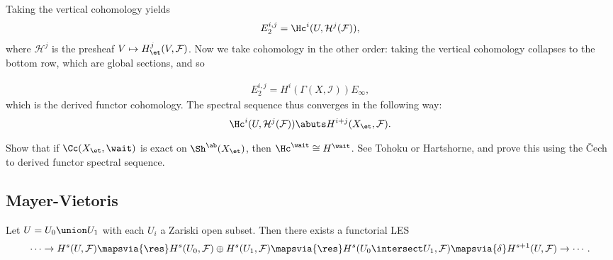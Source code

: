Taking the vertical cohomology yields
\begin{align*}  
E_2^{i, j} = \Hc^i(U, \mathcal{H}^j(\mathcal{F}))
,\end{align*} where \(\mathcal{H}^j\) is the presheaf
\(V\mapsto H_\et^j(V, \mathcal{F})\). Now we take cohomology in the
other order: taking the vertical cohomology collapses to the bottom row,
which are global sections, and so

\begin{align*}  
E_2^{i, j} = H^i(\Gamma(X, \mathcal{I}))  E_{\infty}
,\end{align*} which is the derived functor cohomology. The spectral
sequence thus converges in the following way:
\begin{align*}  
\Hc^i(U, \mathcal{H}^j(\mathcal{F})) \abuts H^{i+j}(X_\et, \mathcal{F})
.\end{align*}

\begin{exercise}

Show that if \(\Cc(X_\et, \wait)\) is exact on \(\Sh^{\ab}(X_\et)\),
then \(\Hc^\wait \cong H^\wait\). See Tohoku or Hartshorne, and prove
this using the Čech to derived functor spectral sequence.

\end{exercise}

\hypertarget{mayer-vietoris}{%
\subsection{Mayer-Vietoris}\label{mayer-vietoris}}

\begin{proposition}[?]

Let \(U = U_0 \union U_1\) with each \(U_i\) a Zariski open subset. Then
there exists a functorial LES
\begin{align*}  
\cdots \to
H^s(U, \mathcal{F}) \mapsvia{\res} 
H^s(U_0, \mathcal{F}) \oplus H^s(U_1, \mathcal{F}) \mapsvia{\res} 
H^s(U_0 \intersect U_1, \mathcal{F}) \mapsvia{\delta}
H^{s+1}(U, \mathcal{F}) \to 
\cdots
.\end{align*}

\end{proposition}

